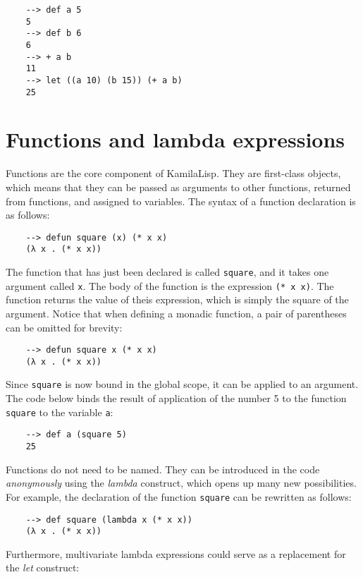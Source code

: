 \begin{Verbatim}
    --> def a 5
    5
    --> def b 6
    6
    --> + a b
    11
    --> let ((a 10) (b 15)) (+ a b)
    25
\end{Verbatim}

\section{Functions and lambda expressions}

Functions are the core component of KamilaLisp. They are first-class objects, which means that they can be passed as arguments to other functions, returned from functions, and assigned to variables. The syntax of a function declaration is as follows:

\begin{Verbatim}
    --> defun square (x) (* x x)
    (λ x . (* x x))
\end{Verbatim}

The function that has just been declared is called \verb|square|, and it takes one argument called \verb|x|. The body of the function is the expression \verb|(* x x)|. The function returns the value of theis expression, which is simply the square of the argument. Notice that when defining a monadic function, a pair of parentheses can be omitted for brevity:

\begin{Verbatim}
    --> defun square x (* x x)
    (λ x . (* x x))
\end{Verbatim}

Since \verb|square| is now bound in the global scope, it can be applied to an argument. The code below binds the result of application of the number 5 to the function \verb|square| to the variable \verb|a|:

\begin{Verbatim}
    --> def a (square 5)
    25
\end{Verbatim}

Functions do not need to be named. They can be introduced in the code \textit{anonymously} using the \textit{lambda} construct, which opens up many new possibilities. For example, the declaration of the function \verb|square| can be rewritten as follows:

\begin{Verbatim}
    --> def square (lambda x (* x x))
    (λ x . (* x x))
\end{Verbatim}

Furthermore, multivariate lambda expressions could serve as a replacement for the \textit{let} construct:

